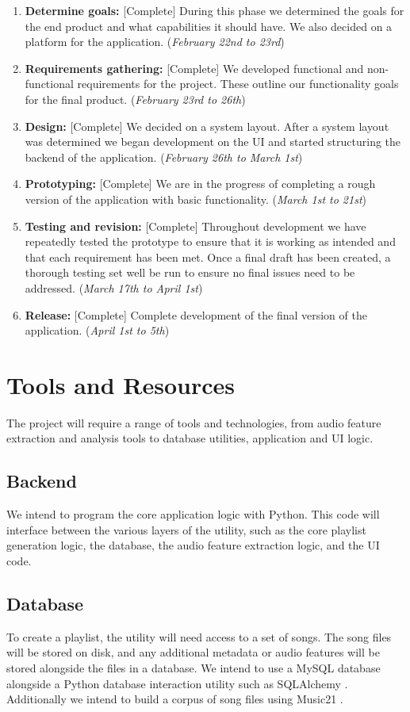 \documentclass{article}
\begin{document}
\begin{enumerate}
    \item \textbf{Determine goals:} [Complete] During this phase we determined the goals for the end product and what capabilities it should have. We also decided on a platform for the application. ({\it February 22nd to 23rd})
    \item \textbf{Requirements gathering:} [Complete] We developed functional and non-functional requirements for the project. These outline our functionality goals for the final product. ({\it February 23rd to 26th})
    \item \textbf{Design:} [Complete] We decided on a system layout. After a system layout was determined we began development on the UI and started structuring the backend of the application. ({\it February 26th to March 1st})
    \item \textbf{Prototyping:} [Complete] We are in the progress of completing a rough version of the application with basic functionality. ({\it March 1st to 21st})
    \item \textbf{Testing and revision:} [Complete] Throughout development we have repeatedly tested the prototype to ensure that it is working as intended and that each requirement has been met. Once a final draft has been created, a thorough testing set well be run to ensure no final issues need to be addressed. ({\it March 17th to April 1st})
    \item \textbf{Release:} [Complete] Complete development of the final version of the application. ({\it April 1st to 5th})
\end{enumerate}

\section{Tools and Resources}
The project will require a range of tools and technologies, from audio feature extraction and analysis tools to database utilities, application and UI logic.

\subsection{Backend}
We intend to program the core application logic with Python. This code will interface between the various layers of the utility, such as the core playlist generation logic, the database, the audio feature extraction logic, and the UI code.

\subsection{Database}
To create a playlist, the utility will need access to a set of songs. The song files will be stored on disk, and any additional metadata or audio features will be stored alongside the files in a database. We intend to use a MySQL database alongside a Python database interaction utility such as SQL\-Alchemy \cite{SQLAlchemy}. Additionally we intend to build a corpus of song files using Music21 \cite{Music21}.
\end{document}
